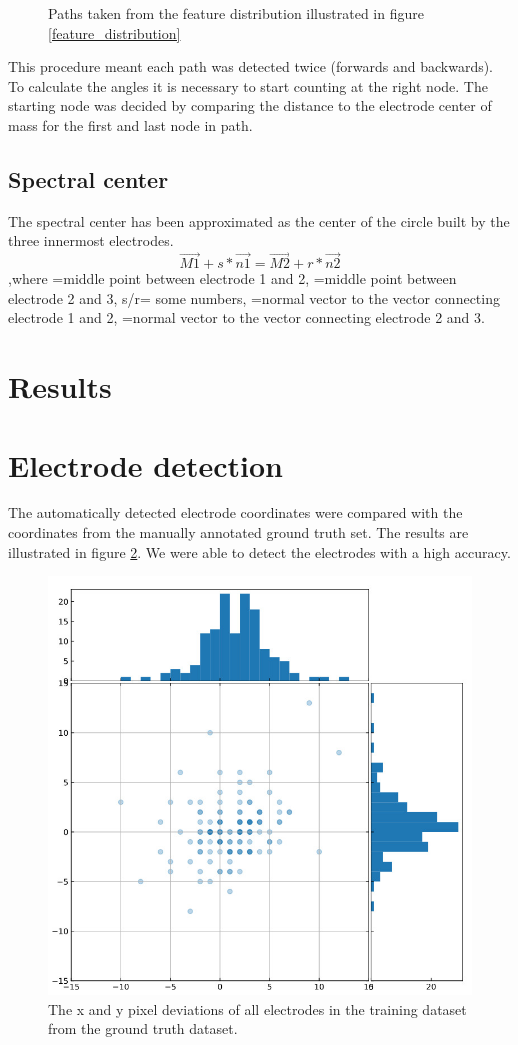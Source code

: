 \documentclass[a4paper, 11pt]{article}
\begin{document}
\begin{enumerate}
\begin{figure}[ht]
\begin{subfigure}[c]{0.32\textwidth}
\end{subfigure}
\caption{Paths taken from the feature distribution illustrated in figure \ref{feature_distribution}}
\label{graphs}
\end{figure}
This procedure meant each path was detected twice (forwards and backwards). To calculate the angles it is necessary to start counting at the right node. The starting node was decided by comparing the distance to the electrode center of mass for the first and last node in path.

\subsection{Spectral center}
The spectral center has been approximated as the center of the circle built by the three innermost electrodes.
$$\overrightarrow{M1}+s*\overrightarrow{n1}=\overrightarrow{M2}+r*\overrightarrow{n2}$$ ,where =middle point between electrode 1 and 2, =middle point between electrode 2 and 3, s/r= some numbers, =normal vector to the vector connecting electrode 1 and 2, =normal vector to the vector connecting electrode 2 and 3.


\section{Results}

\section{Electrode detection}
The automatically detected electrode coordinates were compared with the coordinates from the manually annotated ground truth set. The results are illustrated in figure \ref{results_coord}. We were able to detect the electrodes with a high accuracy.

\begin{figure}[ht]
	\centering
  \includegraphics[width=.5\textwidth]{results_coord.jpeg}
	\caption{The x and y pixel deviations of all electrodes in the training dataset from the ground truth dataset.}
	\label{results_coord}
\end{figure}


\end{enumerate}
\end{document}
